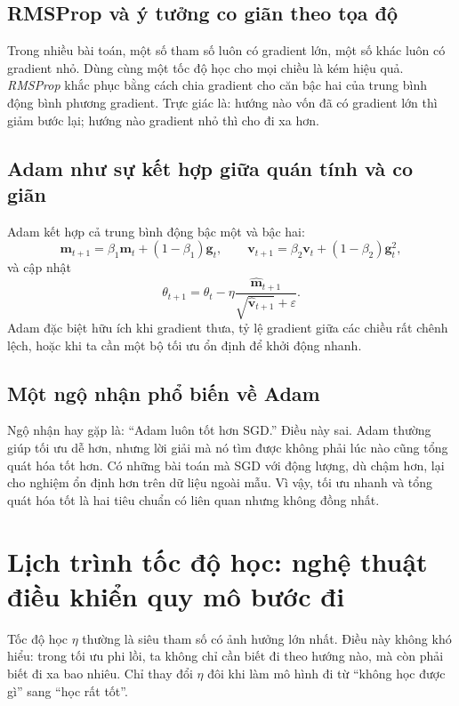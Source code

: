 \subsection{RMSProp và ý tưởng co giãn theo tọa độ}

Trong nhiều bài toán, một số tham số luôn có gradient lớn, một số khác luôn có gradient nhỏ. Dùng cùng một tốc độ học cho mọi chiều là kém hiệu quả. \emph{RMSProp} khắc phục bằng cách chia gradient cho căn bậc hai của trung bình động bình phương gradient. Trực giác là: hướng nào vốn đã có gradient lớn thì giảm bước lại; hướng nào gradient nhỏ thì cho đi xa hơn.

\subsection{Adam như sự kết hợp giữa quán tính và co giãn}

Adam kết hợp cả trung bình động bậc một và bậc hai:
\[
\bm{m}_{t+1}=\beta_1\bm{m}_t + (1-\beta_1)\bm{g}_t,
\qquad
\bm{v}_{t+1}=\beta_2\bm{v}_t + (1-\beta_2)\bm{g}_t^2,
\]
và cập nhật
\[
\theta_{t+1}
=
\theta_t-\eta \frac{\hat{\bm{m}}_{t+1}}{\sqrt{\hat{\bm{v}}_{t+1}}+\varepsilon}.
\]
Adam đặc biệt hữu ích khi gradient thưa, tỷ lệ gradient giữa các chiều rất chênh lệch, hoặc khi ta cần một bộ tối ưu ổn định để khởi động nhanh.

\subsection{Một ngộ nhận phổ biến về Adam}

Ngộ nhận hay gặp là: ``Adam luôn tốt hơn SGD.'' Điều này sai. Adam thường giúp tối ưu dễ hơn, nhưng lời giải mà nó tìm được không phải lúc nào cũng tổng quát hóa tốt hơn. Có những bài toán mà SGD với động lượng, dù chậm hơn, lại cho nghiệm ổn định hơn trên dữ liệu ngoài mẫu. Vì vậy, tối ưu nhanh và tổng quát hóa tốt là hai tiêu chuẩn có liên quan nhưng không đồng nhất.

\section{Lịch trình tốc độ học: nghệ thuật điều khiển quy mô bước đi}

Tốc độ học \(\eta\) thường là siêu tham số có ảnh hưởng lớn nhất. Điều này không khó hiểu: trong tối ưu phi lồi, ta không chỉ cần biết đi theo hướng nào, mà còn phải biết đi xa bao nhiêu. Chỉ thay đổi \(\eta\) đôi khi làm mô hình đi từ ``không học được gì'' sang ``học rất tốt''.

